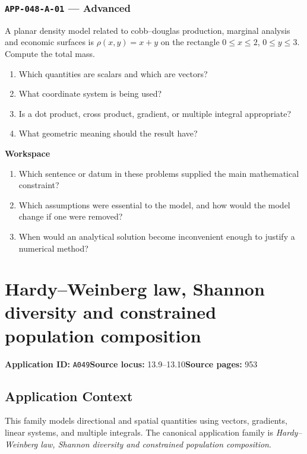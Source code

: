 \documentclass[11pt]{book}
\newcommand{\pid}[1]{\texttt{#1}}
\newcommand{\workspace}{\par\vspace{0.7in}\hrulefill\par\vspace{0.55in}\hrulefill\par}
\begin{document}
\subsection*{\pid{APP-048-A-01} — Advanced}
\begin{problembox}
A planar density model related to cobb–douglas production, marginal analysis and economic surfaces is $\rho(x,y)=x+y$ on the rectangle $0\le x\le 2$, $0\le y\le 3$. Compute the total mass.
\end{problembox}
\begin{promptbox}\begin{enumerate}
\item Which quantities are scalars and which are vectors?
\item What coordinate system is being used?
\item Is a dot product, cross product, gradient, or multiple integral appropriate?
\item What geometric meaning should the result have?
\end{enumerate}\end{promptbox}
\textbf{Workspace}\workspace
\begin{reflectionbox}\begin{enumerate}
\item Which sentence or datum in these problems supplied the main mathematical constraint?
\item Which assumptions were essential to the model, and how would the model change if one were removed?
\item When would an analytical solution become inconvenient enough to justify a numerical method?
\end{enumerate}\end{reflectionbox}
\chapter{Hardy–Weinberg law, Shannon diversity and constrained population composition}\label{app:A049}
\textbf{Application ID:} \pid{A049}\quad \textbf{Source locus:} 13.9–13.10\quad \textbf{Source pages:} 953
\section*{Application Context}
This family models directional and spatial quantities using vectors, gradients, linear systems, and multiple integrals. The canonical application family is \emph{Hardy–Weinberg law, Shannon diversity and constrained population composition}.
\end{document}
